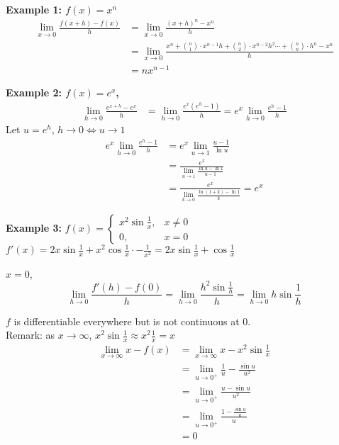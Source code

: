 \documentclass[12pt]{article}
\theoremstyle{plain}
\newcommand{\dlim}{\displaystyle\lim\limits}
\begin{document}
    {\color{Brown}
    \textbf{Example 1: $f(x) = x^n$}
    \begin{align*}
        \dlim_{x\to 0} \frac{f(x+h) - f(x)}h 
        &=\dlim_{x\to 0} \frac{(x+h)^n-x^n}h \\
        &=\dlim_{x\to 0} \frac{x^n + \binom{n}{1} \cdot x^{n-1}h 
        + \binom{n}{2} \cdot x^{n-2} h^2 \cdots + \binom{n}{n} 
      \cdot h^n-x^n}h \\
        &= n x^{n-1}
    \end{align*}

    \textbf{Example 2: $f(x) = e^x$,}
    \begin{align*}
        \dlim_{h\to 0} \frac{e^{x+h}-e^x}{h}
        &=\dlim_{h\to 0} \frac{e^x(e^h-1)}h
        =e^x\dlim_{h\to 0} \frac{e^h-1}h
    \end{align*}
    Let $u = e^h$, $h\to 0 \iff u \to 1$
    \begin{align*}
        e^x\dlim_{h\to 0} \frac{e^h-1}h
        &=e^x\dlim_{u\to 1} \frac{u-1}{\ln u}\\
        &=\frac{e^x}{\dlim_{u\to 1} \frac{\ln u -\ln 1}{u-1}}\\
        &=\frac{e^x}{\dlim_{k\to 0} \frac{\ln (1+k)-\ln 1}k}
        =e^x
    \end{align*}

    \textbf{Example 3: }
    $f(x) = \begin{cases}
        x^2\sin \frac 1x, &x\neq 0\\
        0, &x=0
    \end{cases}$\\

    $f'(x) = 2x\sin\frac1x + x^2\cos \frac 1x \cdot -\frac1{x^2}
    =2x\sin\frac1x +\cos \frac 1x$

    $x=0$, \[
    	\dlim_{h\to 0} \frac{f'(h) - f(0)}h 
				= \dlim_{h\to 0} \frac{h^2\sin \frac1h}h 
				= \dlim_{h\to 0} h\sin \frac 1h
			\]

    $f$ is differentiable everywhere but is not continuous at 0.\\
 
    Remark: as $x\to \infty$, $x^2\sin \frac1x \approx x^2\frac 1x = x$
    \begin{align*}
        \dlim_{x\to \infty} x-f(x) 
        &= \dlim_{x\to\infty} x-x^2\sin \frac 1x\\
        &= \dlim_{u\to 0^+} \frac{1}u -\frac{\sin u}{u^2} \\
        &= \dlim_{u\to 0^+} \frac{u-\sin u}{u^2} \\
        &=\dlim_{u\to 0^+} \frac{1-\frac{\sin u}u}u \\
        &=0
  \end{align*}}
\end{document}
